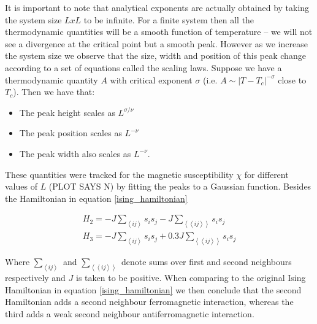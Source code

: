 \documentclass[twoside]{article}
\def\mean#1{\left< #1 \right>}
\begin{document}
\begin{multicols}{2}
It is important to note that analytical exponents are actually obtained by taking the system size $LxL$ to be infinite. For a finite system then all the thermodynamic quantities will be a smooth function of temperature -- we will not see a divergence at the critical point but a smooth peak. However as we increase the system size we observe that the size, width and position of this peak change according to a set of equations called the scaling laws. Suppose we have a thermodynamic quantity $A$ with critical exponent $\sigma$ (i.e. $A \sim |T-T_c|^{-\sigma}$ close to $T_c$). Then we have that:

\begin{itemize}
\item The peak height scales as $L^{\sigma/\nu}$
\item The peak position scales as $L^{-\nu}$
\item The peak width also scales as $L^{-\nu}$.
\end{itemize}

These quantities were tracked for the magnetic susceptibility $\chi$ for different values of $L$ (PLOT SAYS N) by fitting the peaks to a Gaussian function. Besides the Hamiltonian in equation \eqref{ising_hamiltonian}

\begin{align}
\label{second_neigh_hamil}
H_2 = -J\sum_{\mean{ij}} s_i s_j  -J\sum_{\mean{\mean{ij}}} s_i s_j \\
\label{anti_hamil}
H_3 = -J\sum_{\mean{ij}} s_i s_j + 0.3 J \sum_{\mean{\mean{ij}}} s_i s_j 
\end{align}

Where $\sum_{\mean{ij}}$ and $\sum_{\mean{\mean{ij}}}$ denote sums over first and second neighbours respectively and $J$ is taken to be positive. When comparing to the original Ising Hamiltonian in equation \eqref{ising_hamiltonian} we then conclude that the second Hamiltonian adds a second neighbour ferromagnetic interaction, whereas the third adds a weak second neighbour antiferromagnetic interaction.

 
\noindent {}


\end{multicols}
\end{document}
